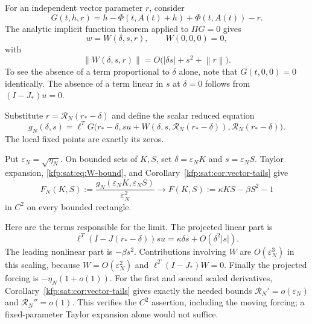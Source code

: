 \documentclass[11pt,a4paper]{article}
\theoremstyle{definition}
\theoremstyle{remark}
\newcommand{\satR}{\mathcal R}
\newcommand{\norm}[1]{\left\lVert#1\right\rVert}
\begin{document}
For an independent vector parameter $r$, consider
\begin{equation}\label{kfp:sat:eq:G}
 G(t,h,r)=h-\Phi(t,A(t)+h)+\Phi(t,A(t))-r.
\end{equation}
The analytic implicit function theorem applied to $\Pi G=0$ gives
\[
 w=W(\delta,s,r),\qquad W(0,0,0)=0,
\]
with
\begin{equation}\label{kfp:sat:eq:W-bound}
 \norm{W(\delta,s,r)}
 =O\bigl(|\delta s|+s^2+\norm r\bigr).
\end{equation}
To see the absence of a term proportional to $\delta$ alone, note that
$G(t,0,0)=0$ identically. The absence of a term linear in $s$ at
$\delta=0$ follows from $(I-J_*)u=0$.

Substitute $r=\satR_N(r_*-\delta)$ and define the scalar reduced equation
\begin{equation}\label{kfp:sat:eq:g}
 g_N(\delta,s)=
 \ell^TG\bigl(r_*-\delta,
 su+W(\delta,s,\satR_N(r_*-\delta)),
 \satR_N(r_*-\delta)\bigr).
\end{equation}
The local fixed points are exactly its zeros.

Put $\varepsilon_N=\sqrt{\eta_N}$. On bounded sets of $K,S$, set
$\delta=\varepsilon_NK$ and $s=\varepsilon_NS$. Taylor expansion,
\eqref{kfp:sat:eq:W-bound}, and Corollary~\ref{kfp:sat:cor:vector-tails} give
\begin{equation}\label{kfp:sat:eq:scaled-reduction}
 F_N(K,S):=\frac{g_N(\varepsilon_NK,\varepsilon_NS)}{\varepsilon_N^2}
 \longrightarrow F(K,S):=\kappa KS-\beta S^2-1
\end{equation}
in $C^2$ on every bounded rectangle.

Here are the terms responsible for the limit. The projected linear part is
\[
 \ell^T(I-J(r_*-\delta))su
 =\kappa\delta s+O(\delta^2|s|).
\]
The leading nonlinear part is $-\beta s^2$. Contributions involving $W$
are $O(\varepsilon_N^3)$ in this scaling, because
$W=O(\varepsilon_N^2)$ and $\ell^T(I-J_*)W=0$. Finally the projected
forcing is $-\eta_N(1+o(1))$. For the first and second scaled derivatives,
Corollary~\ref{kfp:sat:cor:vector-tails} gives exactly the needed bounds
$\satR_N'=o(\varepsilon_N)$ and $\satR_N''=o(1)$. This verifies the
$C^2$ assertion, including the moving forcing; a fixed-parameter Taylor
expansion alone would not suffice.
\end{document}
